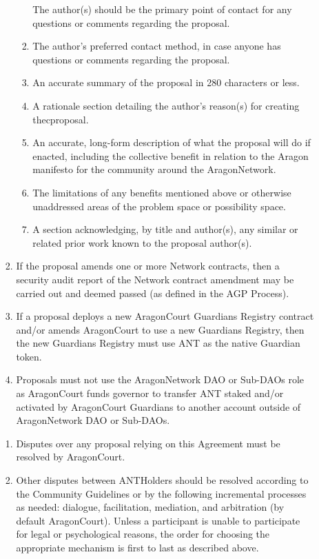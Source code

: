 \begin{enumerate}
\begin{enumerate}
\begin{enumerate}
\begin{enumerate}
				The author(s) should be the primary point of contact for any questions or comments regarding the proposal.
				\item The author’s preferred contact method, in case anyone has questions or comments regarding the proposal.
				\item An accurate summary of the proposal in 280 characters or less.
				\item A rationale section detailing the author’s reason(s) for creating thecproposal.
				\item An accurate, long-form description of what the proposal will do if enacted, including the collective benefit in relation to the Aragon manifesto for the community around the \gls{AragonNetwork}.
				\item The limitations of any benefits mentioned above or otherwise unaddressed areas of the problem space or possibility space.
				\item A section acknowledging, by title and author(s), any similar or related prior work known to the proposal author(s).
			\end{enumerate}
		
			\item If the proposal amends one or more Network contracts, then a security audit report of the Network contract amendment may be carried out and deemed passed (as defined in the \ac{AGP} Process).
			\item If a proposal deploys a new \gls{AragonCourt} \glspl{Guardian} Registry contract and/or
			amends \gls{AragonCourt} to use a new \glspl{Guardian} Registry, then the new \glspl{Guardian} Registry must use \ac{ANT} as the native \gls{Guardian} token.
			\item Proposals must not use the \gls{AragonNetwork} \ac{DAO} or Sub-\acp{DAO} role as \gls{AragonCourt} funds governor to transfer \ac{ANT} staked and/or activated by \gls{AragonCourt} \glspl{Guardian} to another account outside of \gls{AragonNetwork} \ac{DAO} or Sub-\acp{DAO}.
		\end{enumerate}

		\begin{enumerate}
			\item Disputes over any proposal relying on this Agreement must be resolved by \gls{AragonCourt}.
			\item Other disputes between \glspl{ANTHolder} should be resolved according to the Community Guidelines or by the following incremental processes as needed: dialogue, facilitation, mediation, and arbitration (by default \gls{AragonCourt}).
			Unless a participant is unable to participate for legal or psychological reasons, the order for choosing the appropriate mechanism is first to last as described above.
		\end{enumerate}


\end{enumerate}
\end{enumerate}
